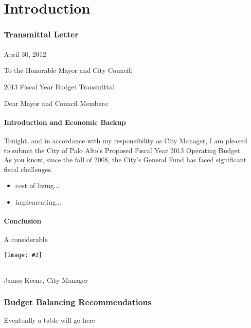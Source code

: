 
\nonstopmode

\usepackage{graphicx}
\usepackage[space]{grffile}
\usepackage{adjustbox}
\newcommand*{\includeimg}[2][]{%
    \begin{adjustbox}{max size={\textwidth}{\textheight}}
        \texttt{[image: \#2]}%
    \end{adjustbox}
}

\part{Introduction}
\section{Transmittal Letter}
\subsection{}
{\itshape{
April 30, 2012 

 To the Honorable Mayor and City Council: 

 2013 Fiscal Year Budget Transmittal 

Dear Mayor and Council Members: 


}}
\subsection{Introduction and Economic Backup}
Tonight, and in accordance with my responsibility as City Manager, I am pleased to submit the City of Palo Alto's Proposed Fiscal Year 2013 Operating Budget. As you know, since the fall of 2008, the City's General Fund has faced significant fiscal challenges.

\begin{itemize}
\item cost of living...
\item implementing...
\end{itemize}
\subsection{Conclusion}
A considerable\\
{\includeimg[height=1in width=2in]{JamesKeeneSig.png}}
\\James Keene, City Manager
\section{Budget Balancing Recommendations}
Eventually a table will go here
